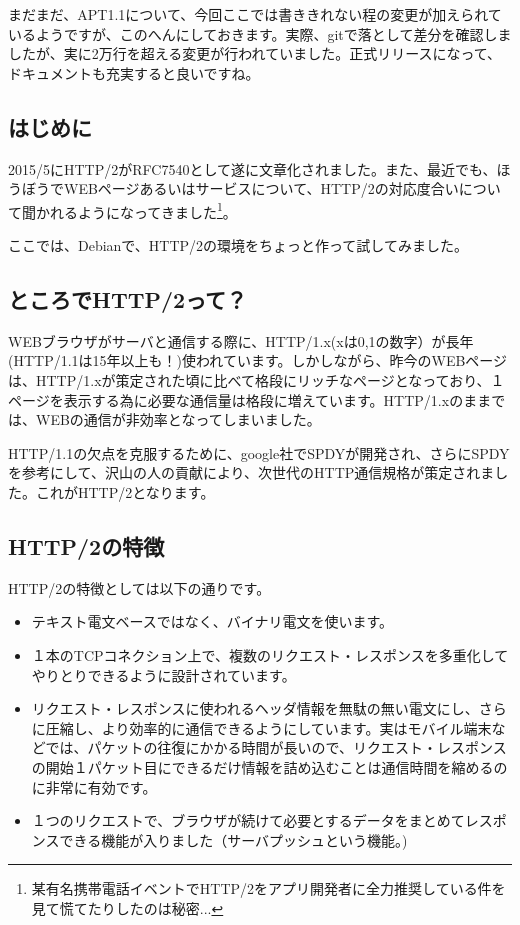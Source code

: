\documentclass[mingoth,a4paper]{jsarticle}
\begin{document}
 まだまだ、APT1.1について、今回ここでは書ききれない程の変更が加えられているようですが、このへんにしておきます。実際、gitで落として差分を確認しましたが、実に2万行を超える変更が行われていました。正式リリースになって、ドキュメントも充実すると良いですね。
   

\subsection{はじめに}

 2015/5にHTTP/2がRFC7540として遂に文章化されました。また、最近でも、ほうぼうでWEBページあるいはサービスについて、HTTP/2の対応度合いについて聞かれるようになってきました\footnote{某有名携帯電話イベントでHTTP/2をアプリ開発者に全力推奨している件を見て慌てたりしたのは秘密...}。

 ここでは、Debianで、HTTP/2の環境をちょっと作って試してみました。

\subsection{ところでHTTP/2って？}

  WEBブラウザがサーバと通信する際に、HTTP/1.x(xは0,1の数字）が長年(HTTP/1.1は15年以上も！)使われています。しかしながら、昨今のWEBページは、HTTP/1.xが策定された頃に比べて格段にリッチなページとなっており、１ページを表示する為に必要な通信量は格段に増えています。HTTP/1.xのままでは、WEBの通信が非効率となってしまいました。

 HTTP/1.1の欠点を克服するために、google社でSPDYが開発され、さらにSPDYを参考にして、沢山の人の貢献により、次世代のHTTP通信規格が策定されました。これがHTTP/2となります。

 \subsection{HTTP/2の特徴}

 HTTP/2の特徴としては以下の通りです\cite{ref:http-2-faq}。
 
\begin{itemize}
\item テキスト電文ベースではなく、バイナリ電文を使います。
\item １本のTCPコネクション上で、複数のリクエスト・レスポンスを多重化してやりとりできるように設計されています。
\item  リクエスト・レスポンスに使われるヘッダ情報を無駄の無い電文にし、さらに圧縮し、より効率的に通信できるようにしています。実はモバイル端末などでは、パケットの往復にかかる時間が長いので、リクエスト・レスポンスの開始１パケット目にできるだけ情報を詰め込むことは通信時間を縮めるのに非常に有効です。
\item １つのリクエストで、ブラウザが続けて必要とするデータをまとめてレスポンスできる機能が入りました（サーバプッシュという機能。)\cite{ref:server-push-primer}
 \end{itemize}
\end{document}
